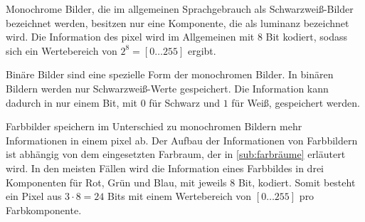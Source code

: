 Monochrome Bilder, die im allgemeinen Sprachgebrauch als Schwarzweiß-Bilder bezeichnet werden, besitzen nur eine
 Komponente, die als \gls{luminanz} bezeichnet wird. Die Information des \gls{pixel} wird im Allgemeinen
 mit 8 Bit kodiert, sodass sich ein Wertebereich von $2^8 = \left[0\dotsc255\right]$ ergibt.

Binäre Bilder sind eine spezielle Form der monochromen Bilder. In binären Bildern werden nur Schwarzweiß-Werte
 gespeichert. Die Information kann dadurch in nur einem Bit, mit $0$ für Schwarz und $1$ für Weiß, gespeichert werden.

Farbbilder speichern im Unterschied zu monochromen Bildern mehr Informationen in einem \gls{pixel} ab. Der Aufbau der
Informationen von Farbbildern ist abhängig von dem eingesetzten Farbraum, der in \autoref{sub:farbräume} erläutert
wird. In den meisten Fällen wird die Information eines Farbbildes in drei Komponenten für Rot, Grün und Blau, mit
jeweils 8 Bit, kodiert. Somit besteht ein Pixel aus \(3 \cdot 8 = 24\) Bits mit einem Wertebereich von
\(\left[0 \dotsc 255\right]\) pro Farbkomponente.


